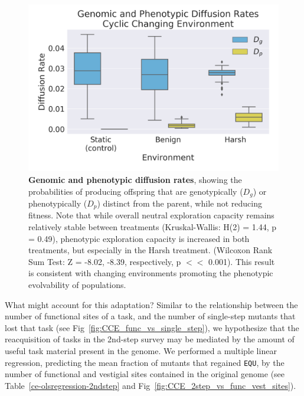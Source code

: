 \documentclass[10pt,letterpaper,final]{article}
\begin{document}
	\begin{figure}[!h] %
	\includegraphics[width=0.95\columnwidth]{figures/CE/CCE_D_g_D_p__box.png}
	\caption{\textbf{Genomic and phenotypic diffusion rates}, showing the probabilities of producing offspring that are genotypically ($D_g$) or phenotypically ($D_p$) distinct from the parent, while not reducing fitness.
	Note that while overall neutral exploration capacity remains relatively stable between treatments (Kruskal-Wallis: H(2) = 1.44, p = 0.49), phenotypic exploration capacity is increased in both treatments, but especially in the Harsh treatment. (Wilcoxon Rank Sum Test: Z = -8.02, -8.39, respectively, p $<<$ 0.001). This result is consistent with changing environments promoting the phenotypic evolvability of populations.
	}\label{fig:CCE_diffusion_rate}
	\end{figure}

What might account for this adaptation? Similar to the relationship between the number of functional sites of a task, and the number of single-step mutants that lost that task (see Fig~\ref{fig:CCE_func_vs_single_step}), we hypothesize that the reacquisition of tasks in the 2nd-step survey may be mediated by the amount of useful task material present in the genome. We performed a multiple linear regression, predicting the mean fraction of mutants that regained \texttt{EQU}, by the number of functional and vestigial sites contained in the original genome (see Table~\ref{ce-olsregression-2ndstep} and Fig~\ref{fig:CCE_2step_vs_func_vest_sites}).
\end{document}
